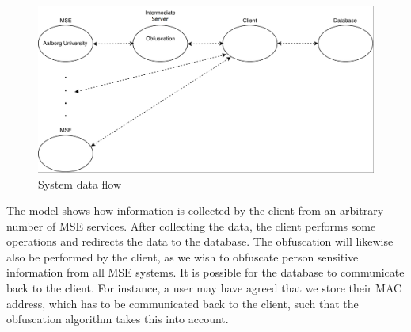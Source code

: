 \begin{figure}[ht]
	\begin{center}
		\includegraphics[scale=0.4]{graphics/ciscoNew.png}
		\caption{System data flow}
		\label{fig:system_flow}
	\end{center}
\end{figure}
The model shows how information is collected by the client from an arbitrary number of MSE services. After collecting the data, the client performs some operations and redirects the data to the database. The obfuscation will likewise also be performed by the client, as we wish to obfuscate person sensitive information from all MSE systems. It is possible for the database to communicate back to the client. For instance, a user may have agreed that we store their MAC address, which has to be communicated back to the client, such that the obfuscation algorithm takes this into account.
